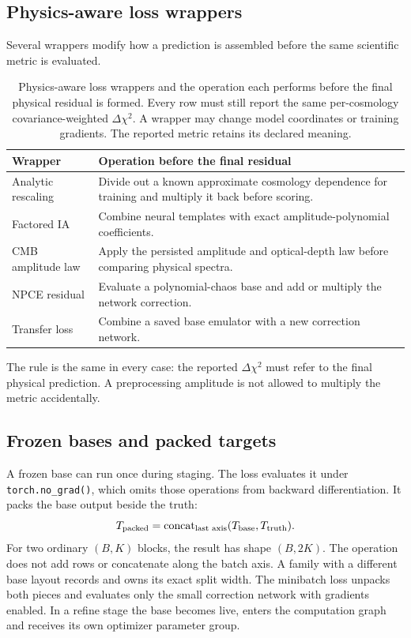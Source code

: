 \documentclass[10pt,aps,prd,twocolumn,nofootinbib]{revtex4-2}
\newcommand{\code}[1]{\texttt{#1}}
\begin{document}
\subsection{Physics-aware loss wrappers}

Several wrappers modify how a prediction is assembled before the same
scientific metric is evaluated.

\begin{table}[t]
\centering
\begin{tabular}{p{}p{}}
\toprule
Wrapper & Operation before the final residual \\
\midrule
Analytic rescaling & Divide out a known approximate cosmology dependence for
training and multiply it back before scoring.  \\
Factored IA & Combine neural templates with exact amplitude-polynomial
coefficients.  \\
CMB amplitude law & Apply the persisted amplitude and optical-depth law before
comparing physical spectra.  \\
NPCE residual & Evaluate a polynomial-chaos base and add or multiply the
network correction.  \\
Transfer loss & Combine a saved base emulator with a new correction network.  \\
\bottomrule
\end{tabular}
\caption{Physics-aware loss wrappers and the operation each performs before
the final physical residual is formed.  Every row must still report the same
per-cosmology covariance-weighted $\Delta\chi^2$.  A wrapper may change model
coordinates or training gradients.  The reported metric retains its declared
meaning.}
\label{tab:loss-wrappers}
\end{table}

The rule is the same in every case: the reported $\Delta\chi^2$ must refer to
the final physical prediction.  A preprocessing amplitude is not allowed to
multiply the metric accidentally.

\subsection{Frozen bases and packed targets}

A frozen base can run once during staging.  The loss evaluates it under
\code{torch.no\_grad()}, which omits those operations from backward
differentiation.  It packs the base output
beside the truth:
\begin{equation*}
  T_{\rm packed}=\operatorname{concat}_{\text{last axis}}
  (T_{\rm base},T_{\rm truth}).
\end{equation*}
For two ordinary $(B,K)$ blocks, the result has shape $(B,2K)$.  The operation
does not add rows or concatenate along the batch axis.  A family with a
different base layout records and owns its exact split width.
The minibatch loss unpacks both pieces and evaluates only the small correction
network with gradients enabled.  In a refine stage the base becomes live,
enters the computation graph and receives its own optimizer parameter group.
\end{document}
